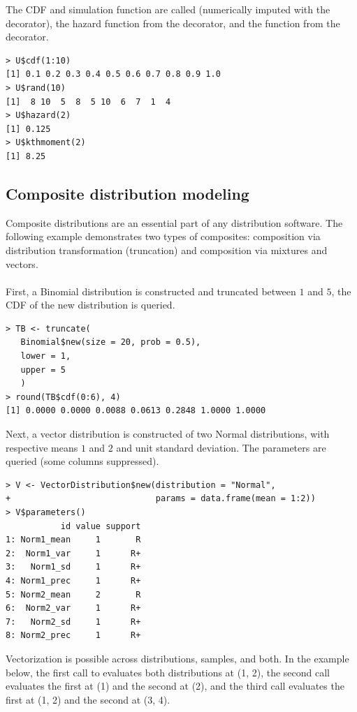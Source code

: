 The CDF and simulation function are called (numerically imputed with the  decorator), the hazard function from the  decorator, and the  function from the  decorator.
\begin{verbatim}
> U$cdf(1:10)
[1] 0.1 0.2 0.3 0.4 0.5 0.6 0.7 0.8 0.9 1.0
> U$rand(10)
[1]  8 10  5  8  5 10  6  7  1  4
> U$hazard(2)
[1] 0.125
> U$kthmoment(2)
[1] 8.25
\end{verbatim}

\subsection{Composite distribution modeling}

Composite distributions are an essential part of any distribution software. The following example demonstrates two types of composites: composition via distribution transformation (truncation) and composition via mixtures and vectors.
\\\\
First, a Binomial distribution is constructed and truncated between $1$ and $5$, the CDF of the new distribution is queried.

\begin{verbatim}
> TB <- truncate(
   Binomial$new(size = 20, prob = 0.5),
   lower = 1,
   upper = 5
   )
> round(TB$cdf(0:6), 4)
[1] 0.0000 0.0000 0.0088 0.0613 0.2848 1.0000 1.0000
\end{verbatim}

Next, a vector distribution is constructed of two Normal distributions, with respective means $1$ and $2$ and unit standard deviation. The parameters are queried (some columns suppressed).

\begin{verbatim}
> V <- VectorDistribution$new(distribution = "Normal",
+                             params = data.frame(mean = 1:2))
> V$parameters()
           id value support
1: Norm1_mean     1       R
2:  Norm1_var     1      R+
3:   Norm1_sd     1      R+
4: Norm1_prec     1      R+
5: Norm2_mean     2       R
6:  Norm2_var     1      R+
7:   Norm2_sd     1      R+
8: Norm2_prec     1      R+
\end{verbatim}

Vectorization is possible across distributions, samples, and both. In the example below, the first call to  evaluates both distributions at (1, 2), the second call evaluates the first at (1) and the second at (2), and the third call evaluates the first at (1, 2) and the second at (3, 4).

